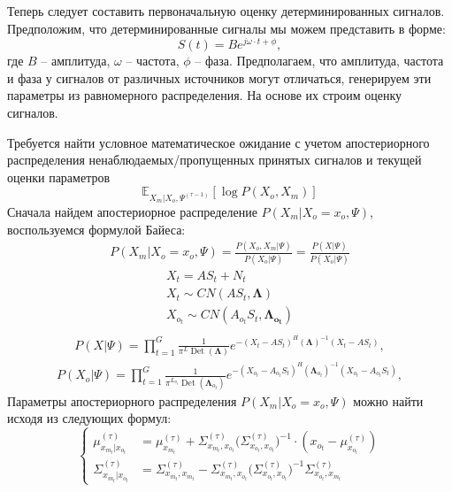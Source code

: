 \documentclass[11pt]{article}
\newcommand{\Expect}{\mathbb{E}}
\DeclareMathOperator{\Det}{Det}
\begin{document}
Теперь следует составить первоначальную оценку детерминированных сигналов. Предположим, что детерминированные сигналы мы можем представить в форме:
\begin{equation}
S(t) = Be^{j\omega \cdot t + \phi},
\end{equation}
где $B$ -- амплитуда, $\omega$ -- частота, $\phi$ -- фаза.
Предполагаем, что амплитуда, частота и фаза у сигналов от различных источников могут отличаться, генерируем эти параметры из равномерного распределения. На основе их строим оценку сигналов.
\begin{center}
\fontsize{14}{18}\selectfont {}
\end{center}
Требуется найти условное математическое ожидание с учетом апостериорного распределения ненаблюдаемых/пропущенных принятых сигналов и текущей оценки параметров
\begin{equation}
 \Expect_{X_m|X_o, \Psi^{(\tau-1)}}[\log P(X_o, X_m)]
\end{equation}
Сначала найдем апостериорное распределение $P(X_m|X_o=x_o,\Psi)$, воспользуемся формулой Байеса:
\begin{gather}
P(X_m|X_o=x_o,\Psi) = \frac{P(X_o, X_m|\Psi)}{P(X_o|\Psi)} = \frac{P(X|\Psi)}{P(X_o|\Psi)}
\end{gather}
\begin{gather*}
X_t = AS_t + N_t \\
X_t \sim CN(A S_t,\mathbf{\Lambda})\\
X_{o_t} \sim CN( A_{o_t}S_t, \mathbf{\Lambda_{o_t}})\\
\end{gather*}
\begin{gather}
P(X|\Psi) = \prod_{t=1}^G \frac{1}{\pi^L \Det(\mathbf{\Lambda})}e^{-(X_t-AS_t)^H (\mathbf{\Lambda})^{-1}(X_t-AS_t)},
\end{gather}
\begin{gather}
P(X_o|\Psi) = \prod_{t=1}^G \frac{1}{\pi^{L_{o_t}} \Det(\mathbf{\Lambda}_{o_t})}e^{-(X_{o_t}-A_{o_t}S_t)^H (\mathbf{\Lambda}_{o_t})^{-1}(X_{o_t}-A_{o_t}S_t)},
\end{gather}
Параметры апостериорного распределения $P(X_m|X_o=x_o,\Psi)$ можно найти исходя из следующих формул:
\begin{equation}
\left\{ \begin{aligned}
\mu_{x_{m_t}|x_{o_t}}^{(\tau)} &= \mu_{x_{m_t}}^{(\tau)} + \Sigma_{x_{m_t},x_{o_t}}^{(\tau)}\Big(\Sigma_{x_{o_t},x_{o_t}}^{(\tau)}\Big)^{-1}\cdot(x_{o_t}-\mu_{x_{o_t}}^{(\tau)}) \\
\Sigma_{x_{m_t}|x_{o_t}}^{(\tau)} &= \Sigma_{x_{m_t},x_{m_t}}^{(\tau)}-\Sigma_{x_{m_t},x_{o_t}}^{(\tau)}\Big(\Sigma_{x_{o_t},x_{o_t}}^{(\tau)}\Big)^{-1}\Sigma_{x_{o_t},x_{m_t}}^{(\tau)}
\end{aligned} \right.
\end{equation}
\end{document}
